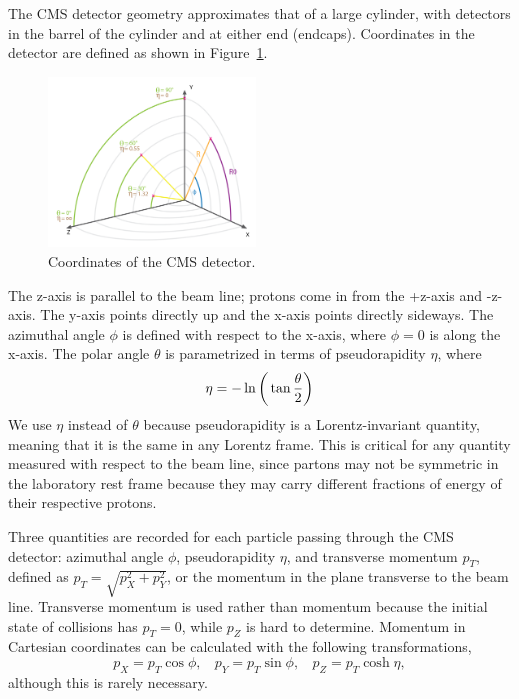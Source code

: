 The CMS detector geometry approximates that of a large cylinder, with detectors in the barrel of the cylinder and at either end (endcaps). Coordinates in the detector are defined as shown in Figure~\ref{Fig:CMS:coordinates}. 
\begin{figure}[h!]
    \centering
    \includegraphics[width=0.49\textwidth]{F3/img_cms_coordinates.png}
    \caption{Coordinates of the CMS detector.}
    \label{Fig:CMS:coordinates}
\end{figure} 
The z-axis is parallel to the beam line; protons come in from the +z-axis and -z-axis. The y-axis points directly up and the x-axis points directly sideways. The azimuthal angle $\phi$ is defined with respect to the x-axis, where $\phi=0$ is along the x-axis. The polar angle $\theta$ is parametrized in terms of pseudorapidity $\eta$, where 
\begin{equation}
    \eta = -\ln\bigg{(}\tan\frac{\theta}{2}\bigg{)}
\end{equation}
We use $\eta$ instead of $\theta$ because pseudorapidity is a Lorentz-invariant quantity, meaning that it is the same in any Lorentz frame. This is critical for any quantity measured with respect to the beam line, since partons may not be symmetric in the laboratory rest frame because they may carry different fractions of energy of their respective protons.

Three quantities are recorded for each particle passing through the CMS detector: azimuthal angle $\phi$, pseudorapidity $\eta$, and transverse momentum $p_{T}$, defined as $p_{T} = \sqrt{p_{X}^{2}+p_{Y}^{2}}$, or the momentum in the plane transverse to the beam line. Transverse momentum is used rather than momentum because the initial state of collisions has $p_{T}=0$, while $p_{Z}$ is hard to determine. Momentum in Cartesian coordinates can be calculated with the following transformations,
\begin{equation}
p_X = p_T\cos\phi, \ \ \ \ 
p_Y = p_T\sin\phi, \ \ \ \
p_Z = p_T\cosh\eta,
\end{equation}
although this is rarely necessary.
\vspace{5mm}

